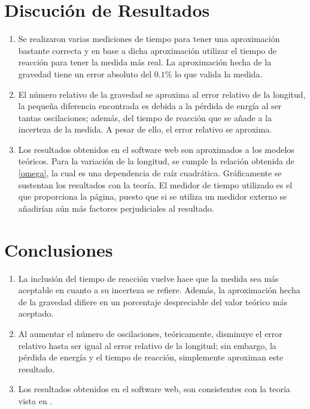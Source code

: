 \documentclass[conference]{IEEEtran}
\begin{document}
    
    
\section{Discución de Resultados}
    \begin{enumerate}
        \item Se realizaron varias mediciones de tiempo para tener una aproximación bastante correcta y en base a dicha aproximación utilizar el tiempo de reacción para tener la medida más real. La aproximación hecha de la gravedad tiene un error absoluto del $0.1\%$ lo que valida la medida.
        \item El número relativo de la gravedad se aproxima al error relativo de la longitud, la pequeña diferencia encontrada es debida a la pérdida de enrgía al ser tantas oscilaciones; además, del tiempo de reacción que se añade a la incerteza de la medida. A pesar de ello, el error relativo se aproxima.
        \item Los resultados obtenidos en el software web son aproximados a los modelos teóricos. Para la variación de la longitud, se cumple la relación obtenida de \eqref{omega}, la cual es una dependencia de raíz cuadrática. Gráficamente se sustentan los resultados con la teoría. El medidor de tiempo utilizado es el que proporciona la página, puesto que si se utiliza un medidor externo se añadirían aún más factores perjudiciales al resultado.
    \end{enumerate}
    
\section{Conclusiones}
    \begin{enumerate}
        \item La inclusión del tiempo de reacción vuelve hace que la medida sea más aceptable en cuanto a su incerteza se refiere. Además, la aproximación hecha de la gravedad difiere en un porcentaje despreciable del valor teórico más aceptado.
        \item Al aumentar el número de oscilaciones, teóricamente, disminuye el error relativo hasta ser igual al error relativo de la longitud; sin embargo, la pérdida de energía y el tiempo de reacción, simplemente aproximan este resultado.
        \item Los resultados obtenidos en el software web, son consistentes con la teoría vista en \cite{b2}. 
    \end{enumerate}
\end{document}
